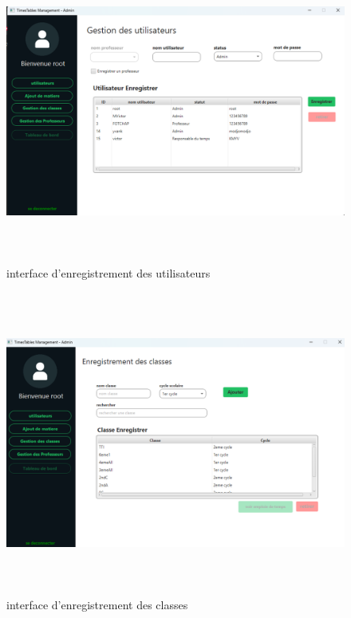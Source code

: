 \documentclass[english,12pt,a4paper]{report}
\begin{document}
\begin{figure}[h]
	\centering
	\includegraphics*[height=10cm, width=12cm]{enregistrementUtilisateur.png}
	\caption{interface d'enregistrement des utilisateurs}
	\label{fig11: enregistrementUtilisateur}
\end{figure} 

\begin{figure}[h]
	\centering
	\includegraphics*[height=10cm, width=12cm]{enregistrementclasse.png}
	\caption{interface d'enregistrement des classes}
	\label{fig12: enregistrementClasse}
\end{figure} 
\end{document}
